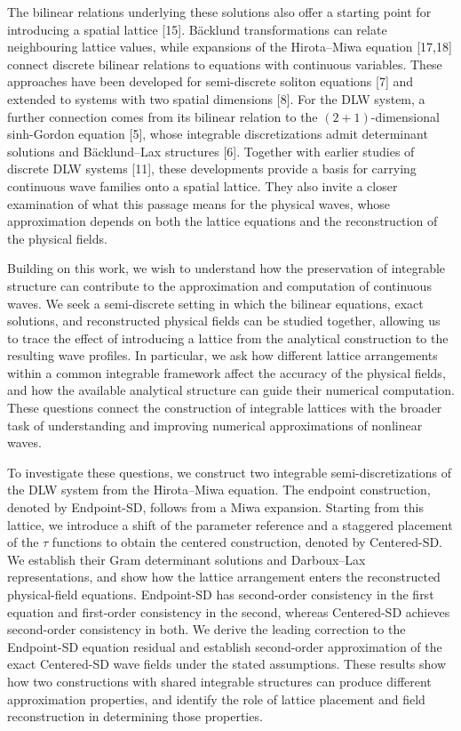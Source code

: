 \documentclass{article}
\theoremstyle{plain}
\theoremstyle{definition}
\begin{document}
The bilinear relations underlying these solutions also offer a starting point for introducing a spatial lattice [15]. Bäcklund transformations can relate neighbouring lattice values, while expansions of the Hirota–Miwa equation [17,18] connect discrete bilinear relations to equations with continuous variables. These approaches have been developed for semi-discrete soliton equations [7] and extended to systems with two spatial dimensions [8]. For the DLW system, a further connection comes from its bilinear relation to the \((2+1)\)-dimensional sinh-Gordon equation [5], whose integrable discretizations admit determinant solutions and Bäcklund–Lax structures [6]. Together with earlier studies of discrete DLW systems [11], these developments provide a basis for carrying continuous wave families onto a spatial lattice. They also invite a closer examination of what this passage means for the physical waves, whose approximation depends on both the lattice equations and the reconstruction of the physical fields.

Building on this work, we wish to understand how the preservation of integrable structure can contribute to the approximation and computation of continuous waves. We seek a semi-discrete setting in which the bilinear equations, exact solutions, and reconstructed physical fields can be studied together, allowing us to trace the effect of introducing a lattice from the analytical construction to the resulting wave profiles. In particular, we ask how different lattice arrangements within a common integrable framework affect the accuracy of the physical fields, and how the available analytical structure can guide their numerical computation. These questions connect the construction of integrable lattices with the broader task of understanding and improving numerical approximations of nonlinear waves.

To investigate these questions, we construct two integrable semi-discretizations of the DLW system from the Hirota–Miwa equation. The endpoint construction, denoted by Endpoint-SD, follows from a Miwa expansion. Starting from this lattice, we introduce a shift of the parameter reference and a staggered placement of the \(\tau\) functions to obtain the centered construction, denoted by Centered-SD. We establish their Gram determinant solutions and Darboux–Lax representations, and show how the lattice arrangement enters the reconstructed physical-field equations. Endpoint-SD has second-order consistency in the first equation and first-order consistency in the second, whereas Centered-SD achieves second-order consistency in both. We derive the leading correction to the Endpoint-SD equation residual and establish second-order approximation of the exact Centered-SD wave fields under the stated assumptions. These results show how two constructions with shared integrable structures can produce different approximation properties, and identify the role of lattice placement and field reconstruction in determining those properties.
\end{document}
